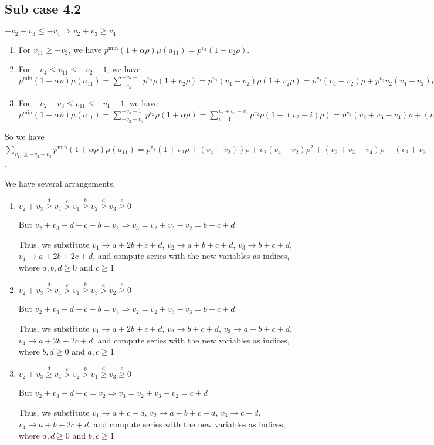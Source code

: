 \documentclass{article}
\begin{document}
\subsection{Sub case 4.2}
$-v_2-v_3\leq{-v_4}\Rightarrow{v_2+v_3\geq{v_4}}$
\begin{enumerate}
    \item 
For $v_{11}\geq{-v_2}$, we have $p^{\min}(1+\alpha\rho)\mu(a_{11})=p^{v_2}(1+v_2\rho).$
\item 
For $-v_4\leq{v_{11}}\leq{-v_2-1}$, we have $p^{\min}(1+\alpha\rho)\mu(a_{11})=\sum_{-v_4}^{-v_2-1}p^{v_2}\rho(1+v_2\rho)=p^{v_2}(v_4-v_2)\rho(1+v_2\rho)=p^{v_2}(v_4-v_2)\rho+p^{v_2}v_2(v_4-v_2)\rho^2.$
\item 
For $-v_2-v_3\leq{v_{11}}\leq{-v_4-1}$, we have $p^{\min}(1+\alpha\rho)\mu(a_{11})=\sum_{-v_2-v_3}^{-v_4-1}p^{v_2}\rho(1+\alpha\rho)=\sum_{i=1}^{v_2+v_3-v_4}p^{v_2}\rho(1+(v_2-i)\rho)=p^{v_2}(v_2+v_3-v_4)\rho+(v_2+v_3-v_4)v_2\rho^2-\binom{v_2+v_3-v_4+1}{2}\rho^2.$
\end{enumerate}
So we have $\sum_{v_{11}\geq{-v_2-v_3}}p^{\min}(1+\alpha\rho)\mu(a_{11})=p^{v_2}(1+v_2\rho+(v_4-v_2))\rho+v_2(v_4-v_2)\rho^2+(v_2+v_3-v_4)\rho+(v_2+v_3-v_4)v_2\rho^2-\frac{(v_2+v_3-v_4+1)(v_2+v_3-v_4)}{2}\rho^2)=p^{v_2}(1+v_2v_4\rho^2+v_2\rho+v_3\rho+v_3v_2\rho^2-v_4v_2\rho^2-\frac{v_2^2}{2}\rho^2-v_2v_3\rho^2+v_2v_4\rho^2-\frac{v_3^2}{2}\rho^2+v_3v_4\rho^2-\frac{v_4^2}{2}\rho^2-\frac{v_2}{2}\rho^2-\frac{v_3}{2}\rho^2+\frac{v_4}{2}\rho^2)$.

We have several arrangements,
\begin{enumerate}
\item 
$v_2+v_3\overset{d}{\geq}v_4\overset{c}{>}v_1\overset{b}{\geq}{v_2}\overset{a}{\geq}v_3\overset{e}{\geq}{0}$

But $v_2+v_3-d-c-b=v_2\Rightarrow{v_3=v_2+v_3-v_2=b+c+d}$

Thus, we substitute 
$v_1\rightarrow{a+2b+c+d}$, 
$v_2\rightarrow{a+b+c+d}$, 
$v_3\rightarrow{b+c+d}$, 
$v_4\rightarrow{a+2b+2c+d}$, and compute series with the new variables as indices, where $a,b,d\geq{0}$ and $c\geq{1}$

\item 
$v_2+v_3\overset{d}{\geq}v_4\overset{c}{>}v_1\overset{b}{\geq}{v_3}\overset{a}{>}v_2\overset{e}{\geq}{0}$

But $v_2+v_3-d-c-b=v_3\Rightarrow{v_2=v_2+v_3-v_3=b+c+d}$

Thus, we substitute 
$v_1\rightarrow{a+2b+c+d}$, 
$v_2\rightarrow{b+c+d}$, 
$v_3\rightarrow{a+b+c+d}$, 
$v_4\rightarrow{a+2b+2c+d}$, and compute series with the new variables as indices, where $b,d\geq{0}$ and $a,c\geq{1}$
\item 
$v_2+v_3\overset{d}{\geq}v_4\overset{c}{>}v_2\overset{b}{>}{v_1}\overset{a}{\geq}v_3\overset{e}{\geq}{0}$

But $v_2+v_3-d-c=v_2\Rightarrow{v_3=v_2+v_3-v_2=c+d}$

Thus, we substitute 
$v_1\rightarrow{a+c+d}$, 
$v_2\rightarrow{a+b+c+d}$, 
$v_3\rightarrow{c+d}$, 
$v_4\rightarrow{a+b+2c+d}$, and compute series with the new variables as indices, where $a,d\geq{0}$ and $b,c\geq{1}$
\end{enumerate}
\end{document}
